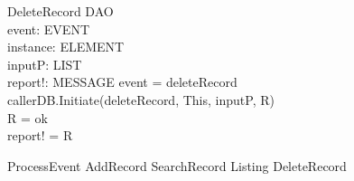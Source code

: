 \begin{schema}{DeleteRecord}
\Delta DAO \\
event: EVENT \\
instance: ELEMENT \\
inputP: LIST \\
report!: MESSAGE
\where event = deleteRecord \\
callerDB.Initiate(deleteRecord, This, inputP, R) \\
R = ok \\ 
report! = R
\end{schema}


\begin{zed} ProcessEvent \sdef  AddRecord 
\lor SearchRecord 
\lor Listing
\lor DeleteRecord
\end{zed}
